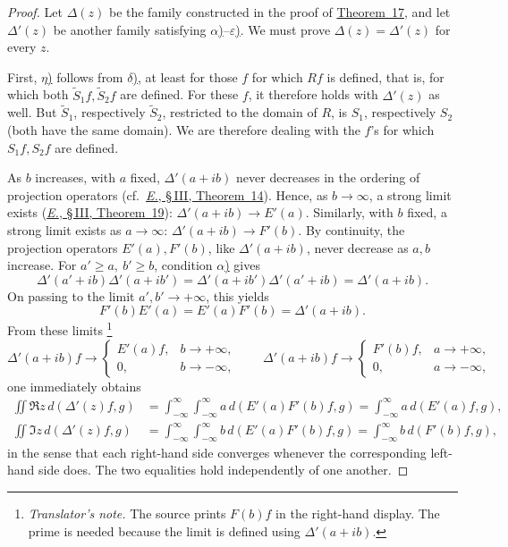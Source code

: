 \documentclass[
  paper=b5,
  twoside=true,
  fontsize=13pt,
  headings=normal,
  bookmarkpackage=false
]{scrartcl}
\theoremstyle{definition}
\newcommand{\TheoremRef}[1]{\hyperref[thm:#1]{Theorem~#1}}
\newcommand{\ErefText}[1]{\href{https://doi.org/10.1007/BF01782338}{#1}}
\newcounter{translatornote}
\newcounter{savedfootnote}
\newcommand{\TranslatorNote}[1]{%
  \stepcounter{translatornote}%
  \setcounter{savedfootnote}{\value{footnote}}%
  \begingroup
    \renewcommand{\thefootnote}{T\arabic{translatornote}}%
    \footnote{\textit{Translator's note.} #1}%
  \endgroup
  \setcounter{footnote}{\value{savedfootnote}}}
\begin{document}
\begin{proof}
Let \(\Delta(z)\) be the family constructed in the proof of
\TheoremRef{17}, and let \(\Delta'(z)\) be another family satisfying
\hyperref[thm:17:alpha]{\(\alpha\))}--\hyperref[thm:17:epsilon]{\(\varepsilon\))}.  We must prove \(\Delta(z)=\Delta'(z)\) for every \(z\).

First, \hyperref[thm:17:eta]{\(\eta\))} follows from \hyperref[thm:17:delta]{\(\delta\))}, at least for those \(f\) for
which \(Rf\) is defined, that is, for which both
\(\widetilde S_1f,\widetilde S_2f\) are defined.  For these \(f\), it
therefore holds with \(\Delta'(z)\) as well.  But
\(\widetilde S_1\), respectively \(\widetilde S_2\), restricted to the
domain of \(R\), is \(S_1\), respectively \(S_2\) (both have the same
domain).  We are therefore dealing with the \(f\)'s for which
\(S_1f,S_2f\) are defined.

As \(b\) increases, with \(a\) fixed, \(\Delta'(a+ib)\) never decreases
in the ordering of projection operators (cf.\ \ErefText{\emph{E.}, \S\,III, Theorem~14}).  Hence, as \(b\to\infty\),
a strong limit exists (\ErefText{\emph{E.}, \S\,III, Theorem~19}):
\(\Delta'(a+ib)\longrightarrow E'(a)\).  Similarly, with \(b\) fixed, a
strong limit exists as \(a\to\infty\): \(\Delta'(a+ib)\longrightarrow F'(b)\).
By continuity, the projection operators \(E'(a),F'(b)\), like
\(\Delta'(a+ib)\), never decrease as \(a,b\) increase.  For
\(a'\geq a,\ b'\geq b\), condition \hyperref[thm:17:alpha]{\(\alpha\))} gives
\[
  \Delta'(a'+ib)\Delta'(a+ib')
  =\Delta'(a+ib')\Delta'(a'+ib)
  =\Delta'(a+ib).
\]
On passing to the limit \(a',b'\to+\infty\), this yields
\[
  F'(b)E'(a)=E'(a)F'(b)=\Delta'(a+ib).
\]
From these limits\TranslatorNote{The source prints \(F(b)f\) in the
right-hand display. The prime is needed because the limit is defined
using \(\Delta'(a+ib)\).}
\[
 \Delta'(a+ib)f\longrightarrow
 \begin{cases}
   E'(a)f,&b\to+\infty,\\
   0,&b\to-\infty,
 \end{cases}
\qquad
 \Delta'(a+ib)f\longrightarrow
 \begin{cases}
   F'(b)f,&a\to+\infty,\\
   0,&a\to-\infty,
 \end{cases}
\]
one immediately obtains
\begin{align*}
 \iint\Re z\,d(\Delta'(z)f,g)
 &=\int_{-\infty}^{\infty}\int_{-\infty}^{\infty}
 a\,d(E'(a)F'(b)f,g)
 =\int_{-\infty}^{\infty}a\,d(E'(a)f,g),\\
 \iint\Im z\,d(\Delta'(z)f,g)
 &=\int_{-\infty}^{\infty}\int_{-\infty}^{\infty}
 b\,d(E'(a)F'(b)f,g)
 =\int_{-\infty}^{\infty}b\,d(F'(b)f,g),
\end{align*}
in the sense that each right-hand side converges whenever the
corresponding left-hand side does.  The two equalities hold
independently of one another.


\end{proof}
\end{document}
